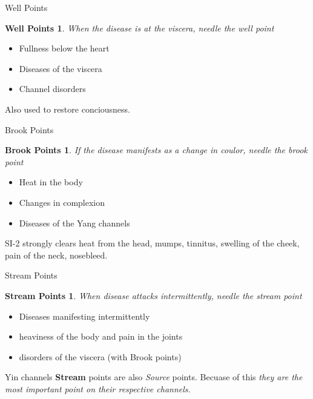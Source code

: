 \begin{frame}{Well Points}
\newtheorem{well}{Well Points}
\begin{well}
When the disease is at the viscera, needle the well point
\end{well}

\begin{itemize}
\item Fullness below the heart
\item Diseases of the viscera
\item Channel disorders
\end{itemize}

\vspace{0.5em}

Also used to restore conciousness.

\end{frame}

\begin{frame}{Brook Points}
\newtheorem{brook}{Brook Points}
\begin{brook}
If the disease manifests as a change in coulor, needle the brook point
\end{brook}

\begin{itemize}
\item Heat in the body
\item Changes in complexion
\item Diseases of the Yang channels
\end{itemize}

\vspace{0.5em}

SI-2 strongly clears heat from the head, mumps, tinnitus, swelling of the cheek, pain of the neck, nosebleed.

\end{frame}

\begin{frame}{Stream Points}
\newtheorem{stream}{Stream Points}
\begin{stream}
When disease attacks intermittently, needle the stream point
\end{stream}

\begin{itemize}
\item Diseases manifesting intermittently
\item heaviness of the body and pain in the joints
\item disorders of the viscera (with Brook points)
\end{itemize}

\vspace{0.5em}

Yin channels \textbf{Stream} points are also \textit{Source} points. Becuase of this \textit{they are the most important point on their respective channels.}

\end{frame}


